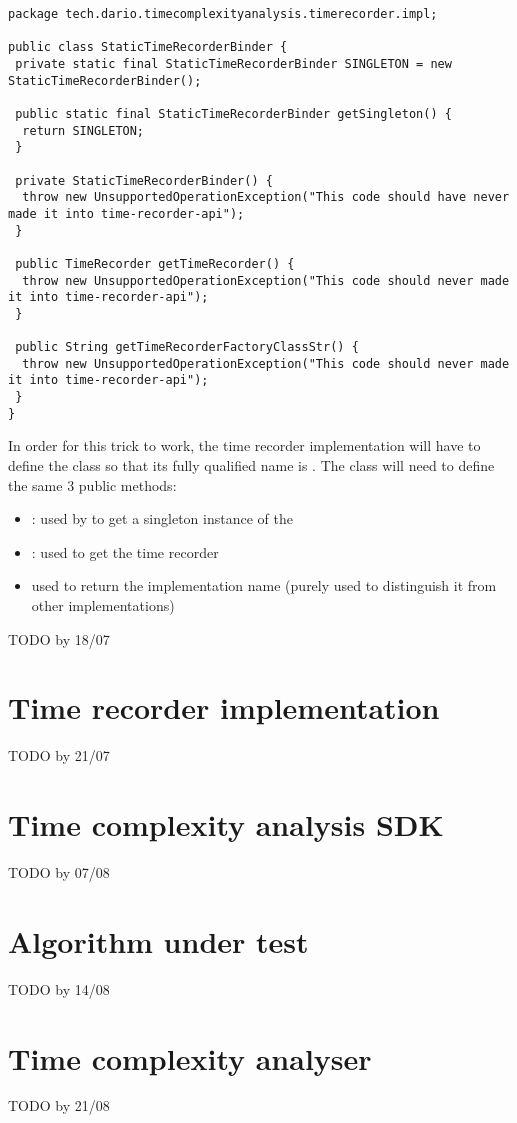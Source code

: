 \begin{lstlisting}[breaklines,caption={StaticTimeRecorderBinder dummy implementation},label=lis:timerecorderapi:statictimerecorderbinderdummy]
package tech.dario.timecomplexityanalysis.timerecorder.impl;

public class StaticTimeRecorderBinder {
 private static final StaticTimeRecorderBinder SINGLETON = new StaticTimeRecorderBinder();

 public static final StaticTimeRecorderBinder getSingleton() {
  return SINGLETON;
 }

 private StaticTimeRecorderBinder() {
  throw new UnsupportedOperationException("This code should have never made it into time-recorder-api");
 }

 public TimeRecorder getTimeRecorder() {
  throw new UnsupportedOperationException("This code should never made it into time-recorder-api");
 }

 public String getTimeRecorderFactoryClassStr() {
  throw new UnsupportedOperationException("This code should never made it into time-recorder-api");
 }
}
\end{lstlisting}

In order for this trick to work, the time recorder implementation will have to define the class so that its fully qualified name is . The class will need to define the same 3 public methods:

\begin{itemize}
  \item \textbf{  }: used by  to get a singleton instance of the 
  \item \textbf{ }: used to get the time recorder
  \item \textbf{ } used to return the implementation name (purely used to distinguish it from other implementations)
\end{itemize}

TODO by 18/07


\section{Time recorder implementation}
\label{sec:implementation:timerecorderimplementation}

TODO by 21/07


\section{Time complexity analysis SDK}

TODO by 07/08


\section{Algorithm under test}

TODO by 14/08


\section{Time complexity analyser}
\label{sec:implementation:timecomplexityanalyser} 
TODO by 21/08
